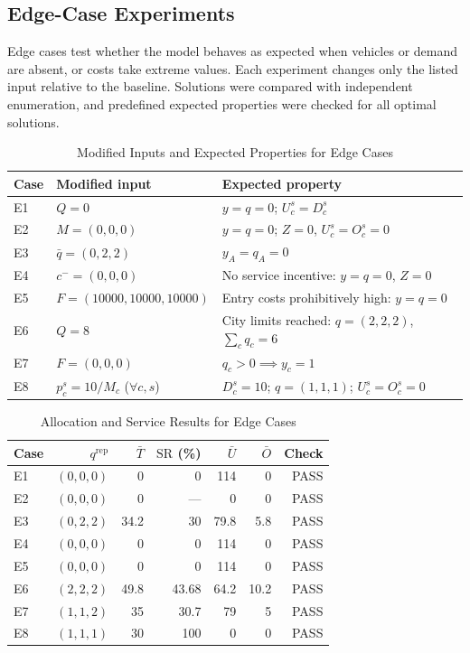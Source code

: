 \documentclass[10pt,a4paper]{article}
\begin{document}
\FloatBarrier
\subsection{Edge-Case Experiments}
Edge cases test whether the model behaves as expected when vehicles or demand are absent, or costs take extreme values. Each experiment changes only the listed input relative to the baseline. Solutions were compared with independent enumeration, and predefined expected properties were checked for all optimal solutions.
\begin{table}[H]
\centering\small
\caption{Modified Inputs and Expected Properties for Edge Cases}\label{tab:sc-edge-design}
\begin{tabular}{lP{.36\linewidth}P{.47\linewidth}}
\toprule
Case & Modified input & Expected property\\\midrule
E1 & $Q=0$ & $y=q=0$; $U_c^s=D_c^s$\\
E2 & $M=(0,0,0)$ & $y=q=0$; $Z=0$, $U_c^s=O_c^s=0$\\
E3 & $\bar q=(0,2,2)$ & $y_A=q_A=0$\\
E4 & $c^-=(0,0,0)$ & No service incentive: $y=q=0$, $Z=0$\\
E5 & $F=(10000,10000,10000)$ & Entry costs prohibitively high: $y=q=0$\\
E6 & $Q=8$ & City limits reached: $q=(2,2,2)$, $\sum_cq_c=6$\\
E7 & $F=(0,0,0)$ & $q_c>0\implies y_c=1$\\
E8 & $p_c^s=10/M_c$ ($\forall c,s$) & $D_c^s=10$; $q=(1,1,1)$; $U_c^s=O_c^s=0$\\
\bottomrule
\end{tabular}
\end{table}
\begin{table}[H]
\centering\small
\caption{Allocation and Service Results for Edge Cases}\label{tab:sc-edge-service}
\begin{tabular}{lrrrrrr}
\toprule
Case & $q^{\mathrm{rep}}$ & $\bar T$ & $\mathrm{SR}$ (\%) & $\bar U$ & $\bar O$ & Check\\\midrule
E1 & $(0,0,0)$ & 0 & 0 & 114 & 0 & PASS\\
E2 & $(0,0,0)$ & 0 & --- & 0 & 0 & PASS\\
E3 & $(0,2,2)$ & 34.2 & 30 & 79.8 & 5.8 & PASS\\
E4 & $(0,0,0)$ & 0 & 0 & 114 & 0 & PASS\\
E5 & $(0,0,0)$ & 0 & 0 & 114 & 0 & PASS\\
E6 & $(2,2,2)$ & 49.8 & 43.68 & 64.2 & 10.2 & PASS\\
E7 & $(1,1,2)$ & 35 & 30.7 & 79 & 5 & PASS\\
E8 & $(1,1,1)$ & 30 & 100 & 0 & 0 & PASS\\
\bottomrule
\end{tabular}
\end{table}
\end{document}
